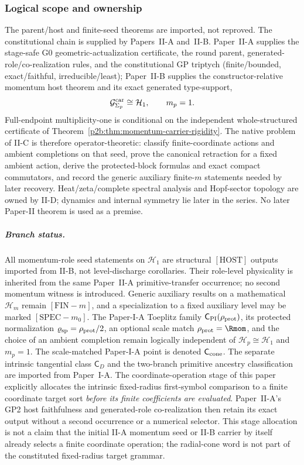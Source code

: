 \documentclass[12pt,a4paper]{article}
\begin{document}
\subsubsection{Logical scope and ownership}
The parent/host and finite-seed theorems are imported, not reproved.  The
  constitutional chain is supplied by Papers~II-A and~II-B.  Paper~II-A supplies the stage-safe G0 geometric-actualization
certificate, the round parent, generated-role/co-realization rules, and the
constitutional GP triptych (finite/bounded, exact/faithful,
irreducible/least); Paper~II-B supplies the constructor-relative momentum
host theorem and its exact generated type-support,
\[
        \mathcal G^{\rm car}_{\Sigma_p}\cong\mathcal H_1,
        \qquad m_p=1.
\]
Full-endpoint multiplicity-one is conditional on the independent
whole-structured certificate of
Theorem~\ref{p2b:thm:momentum-carrier-rigidity}.
The native problem of II-C is therefore operator-theoretic: classify
finite-coordinate actions and ambient completions on that seed, prove the
canonical retraction for a fixed ambient action, derive the protected-block
formulas and exact compact commutators, and record the generic auxiliary
finite-\(m\) statements needed by later recovery.  Heat/zeta/complete spectral
analysis and Hopf-sector topology are owned by II-D; dynamics and internal
symmetry lie later in the series.  No later Paper-II theorem is used as a
premise.

\subparagraph{Branch status.}
All momentum-role seed statements on \(\mathcal H_1\) are structural
\([\mathrm{HOST}]\) outputs imported from II-B, not level-discharge
corollaries.  Their role-level physicality is inherited from the same
Paper~II-A primitive-transfer occurrence; no second momentum witness is
introduced.  Generic auxiliary results on a mathematical \(\mathcal H_m\)
remain \([\mathrm{FIN}{-}m]\), and a specialization to a fixed auxiliary
level may be marked \([\mathrm{SPEC}{-}m_0]\).  The Paper-I-A Toeplitz
family \(\mathsf C_{\rm PI}(\rho_{\rm prot})\), its protected normalization
\(\varrho_{\rm sp}=\rho_{\rm prot}/2\), an optional scale match
\(\rho_{\rm prot}=\Rmom\), and the choice of an ambient completion remain
logically independent of \(\mathcal H_p\cong\mathcal H_1\) and \(m_p=1\).
The scale-matched Paper-I-A point is denoted \(\mathsf C_{\rm cone}\).  The
separate intrinsic tangential class \(\mathsf C_D\) and the two-branch
primitive ancestry classification are imported from Paper~I-A.  The
coordinate-operation stage of this paper explicitly allocates the intrinsic
fixed-radius first-symbol comparison to a finite coordinate target sort
\emph{before its finite coefficients are evaluated}.  Paper~II-A's GP2 host
faithfulness and generated-role co-realization then retain its exact output
without a second occurrence or a numerical selector.  This stage allocation
is not a claim that the initial II-A momentum seed or II-B carrier by itself
already selects a finite coordinate operation; the radial-cone word is not
part of the constituted fixed-radius target grammar.
\end{document}
